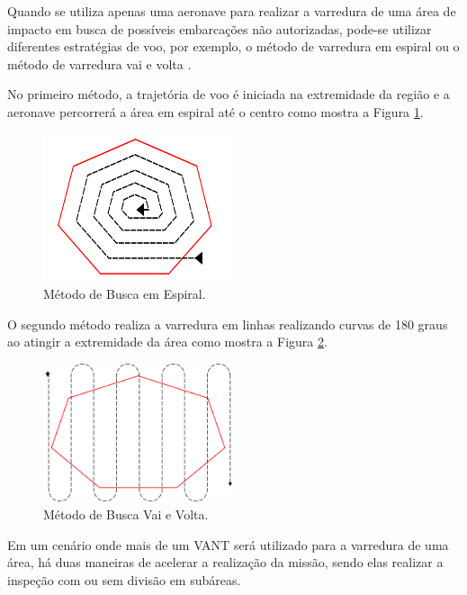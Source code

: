 \label{Cap:Estrategia}

Quando se utiliza apenas uma aeronave para realizar a varredura de uma área de impacto em busca de possíveis embarcações não autorizadas, pode-se utilizar diferentes estratégias de voo, por exemplo, o método de varredura em espiral ou o método de varredura vai e volta \cite{ost2012search}. 

No primeiro método, a trajetória de voo é iniciada na extremidade da região e a aeronave percorrerá a área em espiral até o centro como mostra a Figura \ref{fig:espiral}. 

\begin{figure} 
\center
\includegraphics[width=0.5\textwidth]{espiral.png}
\caption{Método de Busca em Espiral.} 
\label{fig:espiral}
\end{figure} 

O segundo método realiza a varredura em linhas realizando curvas de 180 graus ao atingir a extremidade da área como mostra a Figura \ref{fig:vaievolta}.

\begin{figure} 
\center
\includegraphics[width=0.5\textwidth]{vaievolta.png}
\caption{Método de Busca Vai e Volta.} 
\label{fig:vaievolta}
\end{figure} 

Em um cenário onde mais de um VANT será utilizado para a varredura de uma área, há duas maneiras de acelerar a realização da missão, sendo elas realizar a inspeção com ou sem divisão em subáreas. 

